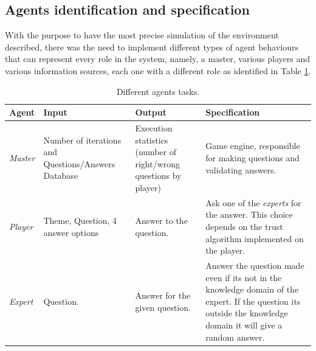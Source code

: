 \documentclass{llncs}
\begin{document}
\subsection{Agents identification and specification}\label{sec:Agents}

With the purpose to have the most precise simulation of the environment described, there was the need to implement different types of agent behaviours that can represent every role in the system, namely, a master, various players and various information sources, each one with a different role as identified in Table \ref{Agent}. 

\begin{table}
\begin{tabular}{| p{1.3cm}| p{3.2cm}| p{3cm}| p{4.3cm}|}
\hline
\textbf{Agent} & \textbf{Input} & \textbf{Output} & \textbf{Specification}                                                                                                                                                                                                                                  \\\hline
\textit{Master} & Number of iterations and Questions/Answers Database                                                           & Execution statistics (number of right/wrong questions by player) & Game engine, responsible for making questions and validating answers. \\ \hline
\textit{Player} & Theme, Question, 4 answer options & Answer to the question. & Ask one of the \textit{experts} for the answer. This choice depends on the trust algorithm implemented on the player.\\ \hline
\textit{Expert} & Question. & Answer for the given question. & Answer the question made even if its not in the knowledge domain of the expert. If the question its outside the knowledge domain it will give a random answer. \\\hline
\end{tabular}\\
\caption{Different agents tasks.}
\label{Agent}
\end{table}
\end{document}
